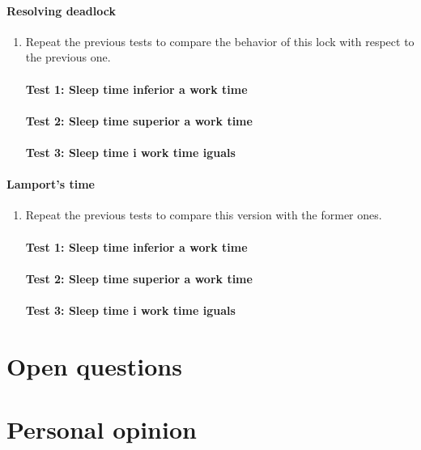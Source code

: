 \documentclass[a4paper, 10pt]{article}
\begin{document}
\paragraph[bold]{Resolving deadlock}
\begin{enumerate}
\item Repeat the previous tests to compare the behavior of this lock with respect to the previous one.
\paragraph[bold]{Test 1: Sleep time inferior a work time}
\paragraph[bold]{Test 2: Sleep time superior a work time}
\paragraph[bold]{Test 3: Sleep time i work time iguals}
\end{enumerate}

\paragraph[bold]{Lamport’s time}
\begin{enumerate}
\item Repeat the previous tests to compare this version with the former ones.
\paragraph[bold]{Test 1: Sleep time inferior a work time}
\paragraph[bold]{Test 2: Sleep time superior a work time}
\paragraph[bold]{Test 3: Sleep time i work time iguals}
\end{enumerate}

\newpage
\section{Open questions}
\section{Personal opinion}
\end{document}
